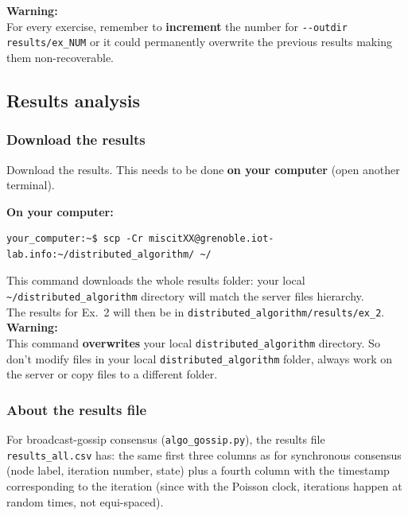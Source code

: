 \documentclass[oneside]{article}
\begin{document}
\textbf{Warning:} \\
For every exercise, remember to \textbf{increment} the number for \verb=--outdir results/ex_NUM=
or it could permanently overwrite the previous results making them non-recoverable.




\subsection{Results analysis}
\subsubsection{Download the results}
Download the results. This needs to be done \textbf{on your computer} (open another terminal).

\textbf{On your computer:} 
\begin{verbatim}
your_computer:~$ scp -Cr miscitXX@grenoble.iot-lab.info:~/distributed_algorithm/ ~/
\end{verbatim}
This command downloads the whole results folder:
your local \verb=~/distributed_algorithm= directory will match the server files hierarchy.\\
The results for Ex.~2 will then be in \verb=distributed_algorithm/results/ex_2=.\\
\textbf{Warning:} \\ This command \textbf{overwrites} your local \verb=distributed_algorithm= directory. So don't modify files in your local \verb=distributed_algorithm= folder, always work on the server or copy files to a different folder.

\subsubsection{About the results file} %

For broadcast-gossip consensus (\verb=algo_gossip.py=), the results file
\verb=results_all.csv= has:
the same first three columns as for synchronous consensus (node label, 
iteration number, state)
plus a fourth column with the timestamp corresponding to the iteration (since with the Poisson clock, iterations happen at random times, not equi-spaced).
\end{document}
